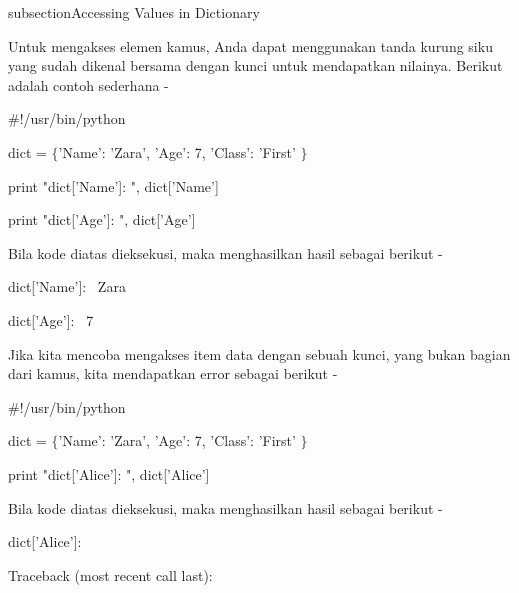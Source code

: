 subsection{Accessing Values in Dictionary} \par 
Untuk mengakses elemen kamus, Anda dapat menggunakan tanda kurung siku yang sudah dikenal bersama dengan kunci untuk mendapatkan nilainya. Berikut adalah contoh sederhana - \par
\noindent 
 \hspace*{0.5in}  $  \#  $!/usr/bin/python \par
\vspace{12pt}
\noindent 
 \hspace*{0.5in} dict =  $  \{  $'Name': 'Zara', 'Age': 7, 'Class': 'First' $  \}  $ \par
\vspace{12pt}
\noindent 
 \hspace*{0.5in} print "dict['Name']: ", dict['Name'] \par
\noindent 
 \hspace*{0.5in} print "dict['Age']: ", dict['Age'] \par
\noindent 
Bila kode diatas dieksekusi, maka menghasilkan hasil sebagai berikut - \par
\noindent 
 \hspace*{0.5in} dict['Name']:~ Zara \par
\noindent 
 \hspace*{0.5in} dict['Age']:~ 7 \par
\noindent 
Jika kita mencoba mengakses item data dengan sebuah kunci, yang bukan bagian dari kamus, kita mendapatkan error sebagai berikut - \par
\noindent 
 \hspace*{0.5in}  $  \#  $!/usr/bin/python \par
\vspace{12pt}
\noindent 
 \hspace*{0.5in} dict =  $  \{  $'Name': 'Zara', 'Age': 7, 'Class': 'First' $  \}  $ \par
\vspace{12pt}
\noindent 
 \hspace*{0.5in} print "dict['Alice']: ", dict['Alice'] \par
\noindent 
Bila kode diatas dieksekusi, maka menghasilkan hasil sebagai berikut - \par
\noindent 
 \hspace*{0.5in} dict['Alice']: \par
\noindent 
 \hspace*{0.5in} Traceback (most recent call last): \par
\noindent 
